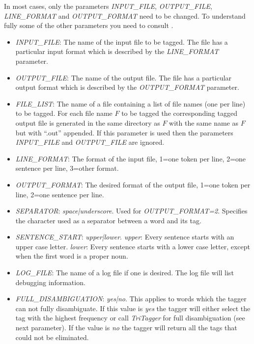 \documentclass[11pt]{article}
\begin{document}
\begin{itemize}
In most cases, only the parameters \emph{INPUT\_FILE}, \emph{OUTPUT\_FILE}, \emph{LINE\_FORMAT} and \emph{OUTPUT\_FORMAT} need to be changed.
To understand fully some of the other parameters you need to consult \citep{lof08}.
\begin{itemize}
\item \emph{INPUT\_FILE}: The name of the input file to be tagged. The file has a particular input format which is described by the \emph{LINE\_FORMAT} parameter.
\item \emph{OUTPUT\_FILE}: The name of the output file. The file has a particular output format which is described by the \emph{OUTPUT\_FORMAT} parameter. 
\item \emph{FILE\_LIST}: The name of a file containing a list of file names (one per line) to be tagged. For each file name $F$ to be tagged the corresponding tagged output file is generated in the same directory as $F$ with the same name as $F$ but with ``.out'' appended. If this parameter is used then the parameters \emph{INPUT\_FILE} and \emph{OUTPUT\_FILE} are ignored. 
\item \emph{LINE\_FORMAT}: The format of the input file, 1=one token per line, 2=one sentence per line, 3=other format.
\item \emph{OUTPUT\_FORMAT}: The desired format of the output file, 1=one token per line, 2=one sentence per line.
\item \emph{SEPARATOR}: \emph{space|underscore}. Used for \emph{OUTPUT\_FORMAT=2}. Specifies the character used as a separator between a word and its tag.
\item \emph{SENTENCE\_START}: \emph{upper|lower}. \emph{upper}: Every sentence starts with an upper case letter. \emph{lower}: Every sentence starts with a lower case letter, except when the first word is a proper noun.
\item \emph{LOG\_FILE}: The name of a log file if one is desired. The log file will list debugging information.
\item \emph{FULL\_DISAMBIGUATION}: \emph{yes|no}. This applies to words which the tagger can not fully disambiguate. If this value is \emph{yes} the tagger will either select the tag with the highest frequency or call \emph{TriTagger} for full disambiguation (see next parameter). If the value is \emph{no} the tagger will return all the tags that could not be eliminated.

\end{itemize}
\end{itemize}
\end{document}
